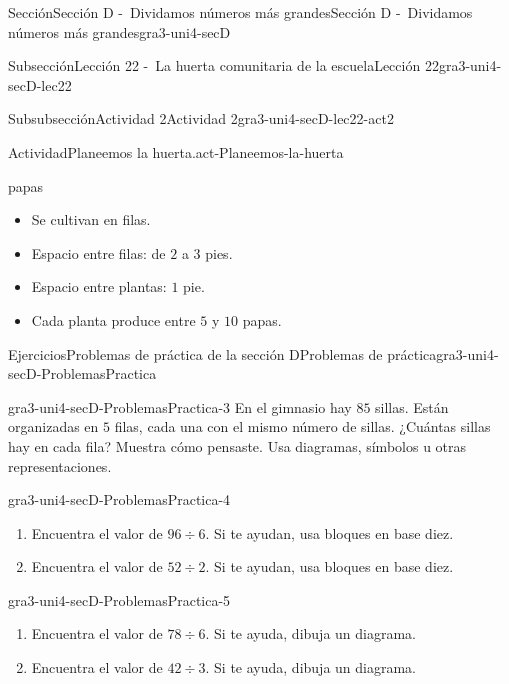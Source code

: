 \documentclass[twoside,14pt,]{extarticle}
\begin{document}
\begin{sectionptx}{Sección}{Sección D -~Dividamos números más grandes}{}{Sección D -~Dividamos números más grandes}{}{}{gra3-uni4-secD}
\begin{subsectionptx}{Subsección}{Lección 22 -~La huerta comunitaria de la escuela}{}{Lección 22}{}{}{gra3-uni4-secD-lec22}
\begin{subsubsectionptx}{Subsubsección}{Actividad 2}{}{Actividad 2}{}{}{gra3-uni4-secD-lec22-act2}
\begin{activity}{Actividad}{Planeemos la huerta.}{act-Planeemos-la-huerta}
\begin{sidebyside}{2}{0}{0}{0}
\begin{sbspanel}{0.5}
papas%
%
\begin{itemize}[label=\textbullet]
\item{}Se cultivan en filas.%
\item{}Espacio entre filas: de \(2\) a \(3\) pies.%
\item{}Espacio entre plantas: \(1\) pie.%
\item{}Cada planta produce entre \(5\) y \(10\) papas.%
\end{itemize}
\end{sbspanel}%
\end{sidebyside}%
\end{activity}%
\end{subsubsectionptx}
\end{subsectionptx}
%
%
\typeout{************************************************}
\typeout{************************************************}
%
\begin{exercises-subsection}{Ejercicios}{Problemas de práctica de la sección D}{}{Problemas de práctica}{}{}{gra3-uni4-secD-ProblemasPractica}
\begin{divisionexercise}{1}{}{}{gra3-uni4-secD-ProblemasPractica-3}%
En el gimnasio hay \(85\) sillas. Están organizadas en \(5\) filas, cada una con el mismo número de sillas. ¿Cuántas sillas hay en cada fila? Muestra cómo pensaste. Usa diagramas, símbolos u otras representaciones.%
\end{divisionexercise}%
\begin{divisionexercise}{2}{}{}{gra3-uni4-secD-ProblemasPractica-4}%
%
\begin{enumerate}[label=(\alph*)]
\item{}Encuentra el valor de \(96 \div 6\). Si te ayudan, usa bloques en base diez.%
\item{}Encuentra el valor de \(52 \div 2\). Si te ayudan, usa bloques en base diez.%
\end{enumerate}
\end{divisionexercise}%
\begin{divisionexercise}{3}{}{}{gra3-uni4-secD-ProblemasPractica-5}%
%
\begin{enumerate}[label=(\alph*)]
\item{}Encuentra el valor de \(78 \div 6\). Si te ayuda, dibuja un diagrama.%
\item{}Encuentra el valor de \(42 \div 3\). Si te ayuda, dibuja un diagrama.%
\end{enumerate}
\end{divisionexercise}%

\end{exercises-subsection}
\end{sectionptx}
\end{document}
